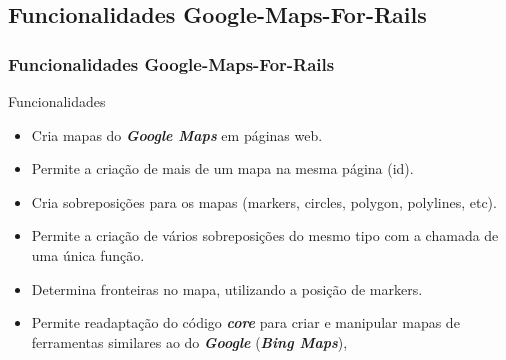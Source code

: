  \subsection{Funcionalidades Google-Maps-For-Rails}
\begin{frame}
 \frametitle{Funcionalidades Google-Maps-For-Rails}

  \begin{block}{Funcionalidades}   

   \begin{itemize}

    \item  Cria mapas do \emph{\textbf{Google Maps}} em páginas web.

    \item  Permite a criação de mais de um mapa na mesma página (id).

    \item  Cria sobreposições para os mapas (markers, circles, polygon, polylines, etc).

    \item  Permite a criação de vários sobreposições do mesmo tipo com a chamada de uma única função.

    \item  Determina fronteiras no mapa, utilizando a posição de markers.

    \item  Permite readaptação do código \emph{\textbf{core}} para criar e manipular mapas de ferramentas
    similares ao do \emph{\textbf{Google}} (\emph{\textbf{Bing Maps}}),

   \end{itemize}

  \end{block}

\end{frame}


